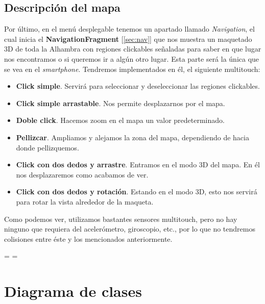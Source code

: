 \documentclass[11pt,a4paper]{article}
\begin{document}
\subsection{Descripción del mapa}
\label{sec:mapa}

Por último, en el menú desplegable tenemos un apartado llamado \textit{Navigation}, el cual inicia el
\textbf{NavigationFragment} [\ref{sec:nav}]
que nos muestra un maquetado 3D de toda la Alhambra con regiones clickables señaladas para saber en que lugar nos encontramos o si queremos
ir a algún otro lugar. Esta parte será la única que se vea en el \textit{smartphone}. Tendremos implementados en él, el siguiente multitouch:

\begin{itemize}
    \item \textbf{Click simple}. Servirá para seleccionar y deseleccionar las regiones clickables.
    \item \textbf{Click simple arrastable}. Nos permite desplazarnos por el mapa.
    \item \textbf{Doble click}. Hacemos zoom en el mapa un valor predeterminado.
    \item \textbf{Pellizcar}. Ampliamos y alejamos la zona del mapa, dependiendo de hacia donde pellizquemos.
    \item \textbf{Click con dos dedos y arrastre}. Entramos en el modo 3D del mapa. En él nos desplazaremos como acabamos de ver.
    \item \textbf{Click con dos dedos y rotación}. Estando en el modo 3D, esto nos servirá para rotar la vista alrededor de la maqueta.
\end{itemize}

Como podemos ver, utilizamos bastantes sensores multitouch, pero no hay ninguno que requiera del acelerómetro, giroscopio, etc., por lo
que no tendremos colisiones entre éste y los mencionados anteriormente.



%

\recalctypearea
\pdfpageheight=\paperheight
\pdfpagewidth=\paperwidth
\pagestyle{lscape}

\newpage

\section{Diagrama de clases}
\end{document}
